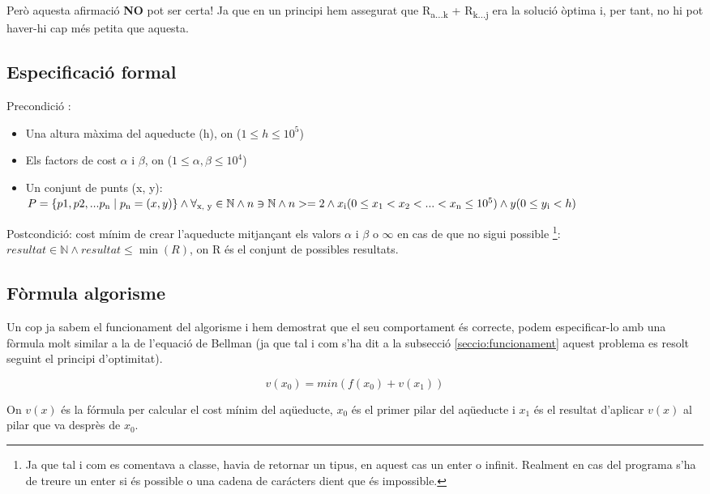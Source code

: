 \documentclass[12pt, letterpaper]{article}
\begin{document}
Però aquesta afirmació \textbf{NO} pot ser certa! Ja que en un principi hem assegurat que R\textsubscript{a...k} + R\textsubscript{k...j} era la solució òptima i, per tant, no hi pot haver-hi cap més petita que aquesta.


\subsection{Especificació formal}
Precondició :
\begin{itemize}
    \item Una altura màxima del aqueducte (h), on ($1 \leq h \leq 10^5$)
    \item Els factors de cost $\alpha$ i $\beta$, on ($1\leq \alpha, \beta \leq 10^4$)
    \item Un conjunt de punts (x, y):\\
        $P = \{p1, p2, ... p\textsubscript{n} \mid p\textsubscript{n} = (x, y) \} \land \forall \textsubscript{x, y} \in \mathbb{N} \land n \owns \mathbb{N} \land n >= 2 
        \land x\textsubscript{i} (0\leq x\textsubscript{1} < x\textsubscript{2} < ... < x\textsubscript{n} \leq 10^5) \land y (0 \leq y\textsubscript{i} < h) $

\end{itemize}
Postcondició: cost mínim de crear l'aqueducte mitjançant els valors $\alpha$ i $\beta$ o $\infty$ en cas de que no sigui possible \footnote{Ja que tal i com es comentava a classe, havia de retornar un tipus, en aquest cas un enter o infinit. Realment en cas del programa s'ha de treure un enter si és possible o una cadena de carácters dient que és impossible.}:\\

        $ resultat \in \mathbb{N} \land resultat \leq \min(R) $, on R és el conjunt de possibles resultats.


\subsection{Fòrmula algorisme}
Un cop ja sabem el funcionament del algorisme i hem demostrat que el seu comportament és correcte, podem especificar-lo amb una fòrmula molt similar a la de l'equació de Bellman (ja que tal i com s'ha dit a la subsecció \ref{seccio:funcionament} aquest problema es resolt seguint el principi d'optimitat).
\begin{center}
\begin{equation}
v(x_{0}) = min(f(x_{0}) + v(x_{1}))
\end{equation}
\end{center}
On $v(x)$ és la fórmula per calcular el cost mínim del aqüeducte, $x_{0}$ és el primer pilar del aqüeducte i $x_{1}$ és el resultat d'aplicar $v(x)$ al pilar que va desprès de $x_{0}$.
\end{document}
